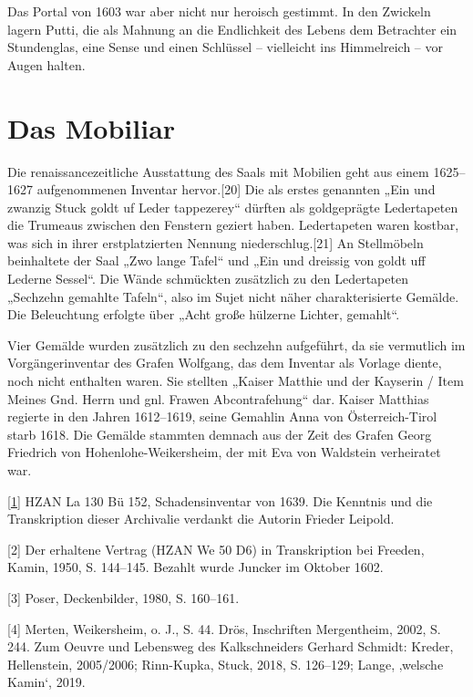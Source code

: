 \documentclass[
  a4paper,
  openany]{book}
\begin{document}
Das Portal von 1603 war aber nicht nur heroisch gestimmt. In den
Zwickeln lagern Putti, die als Mahnung an die Endlichkeit des Lebens dem
Betrachter ein Stundenglas, eine Sense und einen Schlüssel -- vielleicht
ins Himmelreich -- vor Augen halten.

\section{Das Mobiliar}\label{das-mobiliar}

Die renaissancezeitliche Ausstattung des Saals mit Mobilien geht aus
einem 1625--1627 aufgenommenen Inventar hervor.{[}20{]} Die als erstes
genannten „Ein und zwanzig Stuck goldt uf Leder tappezerey`` dürften als
goldgeprägte Ledertapeten die Trumeaus zwischen den Fenstern geziert
haben. Ledertapeten waren kostbar, was sich in ihrer erstplatzierten
Nennung niederschlug.{[}21{]} An Stellmöbeln beinhaltete der Saal „Zwo
lange Tafel`` und „Ein und dreissig von goldt uff Lederne Sessel``. Die
Wände schmückten zusätzlich zu den Ledertapeten „Sechzehn gemahlte
Tafeln``, also im Sujet nicht näher charakterisierte Gemälde. Die
Beleuchtung erfolgte über „Acht große hülzerne Lichter, gemahlt``.

Vier Gemälde wurden zusätzlich zu den sechzehn aufgeführt, da sie
vermutlich im Vorgängerinventar des Grafen Wolfgang, das dem Inventar
als Vorlage diente, noch nicht enthalten waren. Sie stellten „Kaiser
Matthie und der Kayserin / Item Meines Gnd. Herrn und gnl. Frawen
Abcontrafehung`` dar. Kaiser Matthias regierte in den Jahren 1612--1619,
seine Gemahlin Anna von Österreich-Tirol starb 1618. Die Gemälde
stammten demnach aus der Zeit des Grafen Georg Friedrich von
Hohenlohe-Weikersheim, der mit Eva von Waldstein verheiratet war.

\href{https://www.deckenmalerei.eu/edit/451519cf-21f1-45da-b455-d7e7268ed471\#_ftnref1}{{[}1{]}}
HZAN La 130 Bü 152, Schadensinventar von 1639. Die Kenntnis und die
Transkription dieser Archivalie verdankt die Autorin Frieder Leipold.

{[}2{]} Der erhaltene Vertrag (HZAN We 50 D6) in Transkription bei
Freeden, Kamin, 1950, S. 144--145. Bezahlt wurde Juncker im Oktober
1602.

{[}3{]} Poser, Deckenbilder, 1980, S. 160--161.

{[}4{]} Merten, Weikersheim, o. J., S. 44. Drös, Inschriften
Mergentheim, 2002, S. 244. Zum Oeuvre und Lebensweg des Kalkschneiders
Gerhard Schmidt: Kreder, Hellenstein, 2005/2006; Rinn-Kupka, Stuck,
2018, S. 126--129; Lange, ‚welsche Kamin`, 2019.
\end{document}
